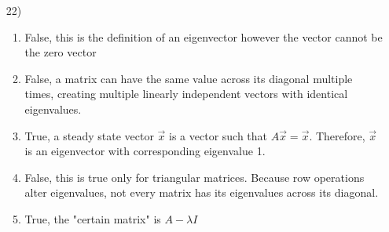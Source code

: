 \documentclass{article}
\begin{document}
\begin{enumerate}
  \item[22)]
    \begin{enumerate}
      \item
        False, this is the definition of an eigenvector however
        the vector cannot be the zero vector
      \item
        False, a matrix can have the same value across its 
        diagonal multiple times, creating multiple linearly 
        independent vectors with identical eigenvalues.
      \item 
        True, a steady state vector $\vec x$ is 
        a vector such that $A \vec x= \vec x$.
        Therefore, $\vec x$ is an eigenvector with 
        corresponding eigenvalue 1.
      \item 
        False, this is true only for triangular matrices. 
        Because row operations alter eigenvalues, not every matrix
        has its eigenvalues across its diagonal. 
      \item 
        True, the "certain matrix" is $A - \lambda I$
  \end{enumerate}
\end{enumerate}
\end{document}
